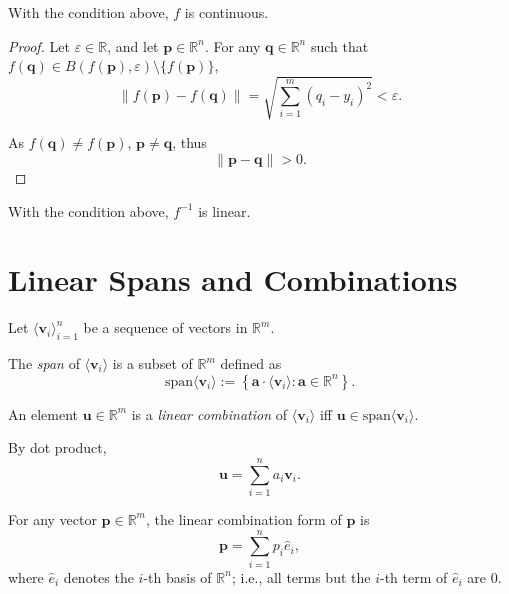 \begin{lemma}
	\label{lm: linear map: is continuous}
	With the condition above, $f$ is continuous.
	
	\begin{proof}
		Let $\varepsilon \in \mathbb R$, and let $\mathbf p \in \mathbb R^n$. For any $\mathbf q \in \mathbb R^n$ such that $f(\mathbf q) \in B (f(\mathbf p), \varepsilon) \setminus \{f(\mathbf p)\}$,
		$$
		\|f(\mathbf p) - f(\mathbf q) \| = \sqrt{\sum_{i=1}^m (q_i - y_i)^2} < \varepsilon.
		$$
		
		As $f(\mathbf q) \ne f(\mathbf p)$, $\mathbf p \ne \mathbf q$, thus
		$$
		\| \mathbf p - \mathbf q \| > 0.
		$$
	\end{proof}
\end{lemma}


\begin{lemma}
	With the condition above, $f^{-1}$ is linear.
\end{lemma}





\section{Linear Spans and Combinations}


\begin{definition}
	\label{def: span}	
	Let $\langle\mathbf v_i\rangle_{i = 1}^n$ be a sequence of vectors in $\mathbb R^m$.
	
	The \textit{span} of $\langle\mathbf v_i\rangle$ is a subset of $\mathbb R^m$ defined as
	$$
	\mathrm{span}\langle\mathbf v_i\rangle := \left\{ \mathbf a \cdot \langle\mathbf v_i\rangle : \mathbf a \in \mathbb R^n \right\}.
	$$
	
	An element $\mathbf u \in \mathbb R^m$ is a \textit{linear combination} of $\langle\mathbf v_i\rangle$ iff $\mathbf u \in \mathrm{span}\langle \mathbf v_i\rangle$.
\end{definition}



\begin{note}
	By dot product,
	$$
	\mathbf u = \sum_{i = 1}^n a_i \mathbf v_i.
	$$
\end{note}


\begin{note}
	For any vector $\mathbf p \in \mathbb R^m$, the linear combination form of $\mathbf p$ is
	$$
	\mathbf p = \sum_{i = 1}^n p_i \hat e_i,
	$$
	where $\hat e_i$ denotes the $i$-th basis of $\mathbb R^n$; i.e., all terms but the $i$-th term of $\hat e_i$ are $0$.
\end{note}


